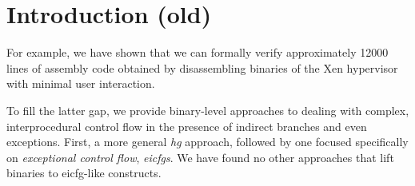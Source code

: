 \chapter{Introduction (old)}

For example, we have shown that we can formally verify approximately \num{12000} lines of assembly code obtained by disassembling binaries of the Xen hypervisor \autocite{xen} with minimal user interaction.

To fill the latter gap, we provide binary-level approaches to dealing with complex, interprocedural control flow in the presence of indirect branches and even exceptions.
First, a more general \emph{\ac{hg}} approach, followed by one focused specifically on \emph{exceptional control flow}, \emph{\acp{eicfg}}.
We have found no other approaches that lift binaries to \ac{eicfg}-like constructs.
